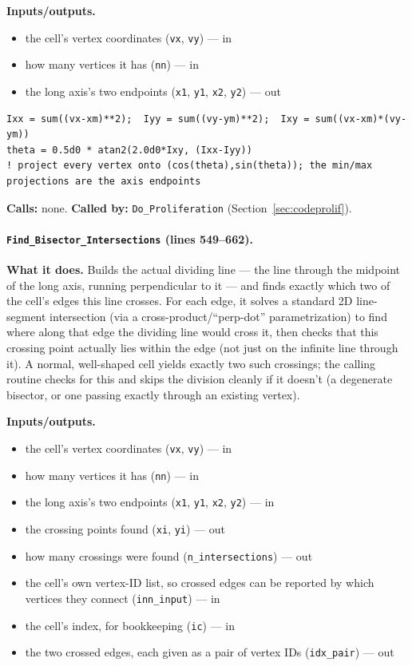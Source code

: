 \documentclass[11pt]{article}
\begin{document}
\textbf{Inputs/outputs.}
\begin{itemize}[nosep]
  \item the cell's vertex coordinates (\texttt{vx}, \texttt{vy}) --- in
  \item how many vertices it has (\texttt{nn}) --- in
  \item the long axis's two endpoints (\texttt{x1}, \texttt{y1}, \texttt{x2}, \texttt{y2}) --- out
\end{itemize}

\begin{lstlisting}[caption={The closed-form principal-axis angle in \texttt{Find\_Principle\_Axis}.}]
Ixx = sum((vx-xm)**2);  Iyy = sum((vy-ym)**2);  Ixy = sum((vx-xm)*(vy-ym))
theta = 0.5d0 * atan2(2.0d0*Ixy, (Ixx-Iyy))
! project every vertex onto (cos(theta),sin(theta)); the min/max projections are the axis endpoints
\end{lstlisting}

\textbf{Calls:} none. \textbf{Called by:} \texttt{Do\_Proliferation}
(Section~\ref{sec:codeprolif}).

\paragraph{\texttt{Find\_Bisector\_Intersections} (lines 549--662).}
\textbf{What it does.} Builds the actual dividing line --- the line through the
midpoint of the long axis, running perpendicular to it --- and finds exactly which two
of the cell's edges this line crosses. For each edge, it solves a standard 2D
line-segment intersection (via a cross-product/``perp-dot'' parametrization) to find
where along that edge the dividing line would cross it, then checks that this crossing
point actually lies within the edge (not just on the infinite line through it). A
normal, well-shaped cell yields exactly two such crossings; the calling routine checks
for this and skips the division cleanly if it doesn't (a degenerate bisector, or one
passing exactly through an existing vertex).

\textbf{Inputs/outputs.}
\begin{itemize}[nosep]
  \item the cell's vertex coordinates (\texttt{vx}, \texttt{vy}) --- in
  \item how many vertices it has (\texttt{nn}) --- in
  \item the long axis's two endpoints (\texttt{x1}, \texttt{y1}, \texttt{x2}, \texttt{y2}) --- in
  \item the crossing points found (\texttt{xi}, \texttt{yi}) --- out
  \item how many crossings were found (\texttt{n\_intersections}) --- out
  \item the cell's own vertex-ID list, so crossed edges can be reported by which vertices they connect (\texttt{inn\_input}) --- in
  \item the cell's index, for bookkeeping (\texttt{ic}) --- in
  \item the two crossed edges, each given as a pair of vertex IDs (\texttt{idx\_pair}) --- out
\end{itemize}
\end{document}
